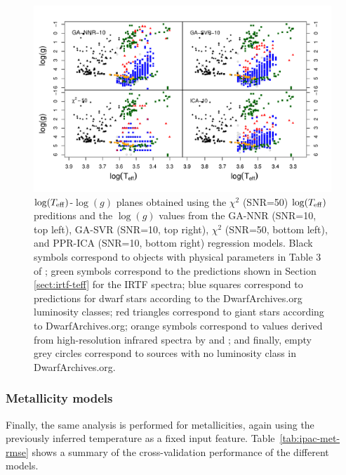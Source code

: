 \begin{figure}
 \begin{center}
 \includegraphics[width=\textwidth]{figs/ipac-teff-logg}

\caption{$\log(T_{\rm eff})$-$\log(g)$ planes obtained using the $\chi^2$ (SNR=50)
$\log(T_{\rm eff})$ preditions and the $\log(g)$ values from the
GA-NNR (SNR=10, top left), GA-SVR (SNR=10, top right), $\chi^2$
(SNR=50, bottom left), and PPR-ICA (SNR=10, bottom right) regression
models. Black symbols correspond to objects with physical parameters
in Table 3 of \protect\cite{cesetti}; green symbols correspond to the
predictions shown in Section \ref{sect:irtf-teff} for the IRTF
spectra; blue squares correspond to predictions for dwarf stars
according to the DwarfArchives.org luminosity classes; red triangles
correspond to giant stars according to DwarfArchives.org; orange
symbols correspond to values derived from high-resolution infrared
spectra by \protect\cite{esm1} and \protect\cite{esm2};
and finally, empty grey circles correspond to sources with no
luminosity class in DwarfArchives.org.}

\label{fig:teffvsloggIPAC}
 \end{center}
\end{figure}

\subsubsection{Metallicity models} 

Finally, the same analysis is performed for metallicities, again using
the previously inferred temperature as a fixed input feature.
Table~\ref{tab:ipac-met-rmse} shows a summary of the cross-validation
performance of the different models.

